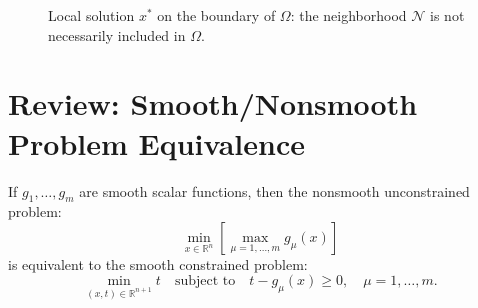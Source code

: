 \begin{figure}[H]
\centering
{}
\caption{Local solution $x^*$ on the boundary of $\Omega$: the neighborhood $\mathcal{N}$ is not necessarily included in $\Omega$.}
\label{fig:local-solution-feasible}
\end{figure}

\section{Review: Smooth/Nonsmooth Problem Equivalence}

\begin{remarque}
If $g_1, \dots, g_m$ are smooth scalar functions, then the nonsmooth unconstrained problem:
\begin{equation}
    \min_{x \in \mathbb{R}^n} \left[ \max_{\mu = 1, \dots, m} g_\mu(x) \right]
\end{equation}
is equivalent to the smooth constrained problem:
\begin{equation}
    \min_{(x, t) \in \mathbb{R}^{n+1}} t \quad \text{subject to} \quad t - g_\mu(x) \geq 0, \quad \mu = 1, \dots, m.
\end{equation}
\end{remarque}

